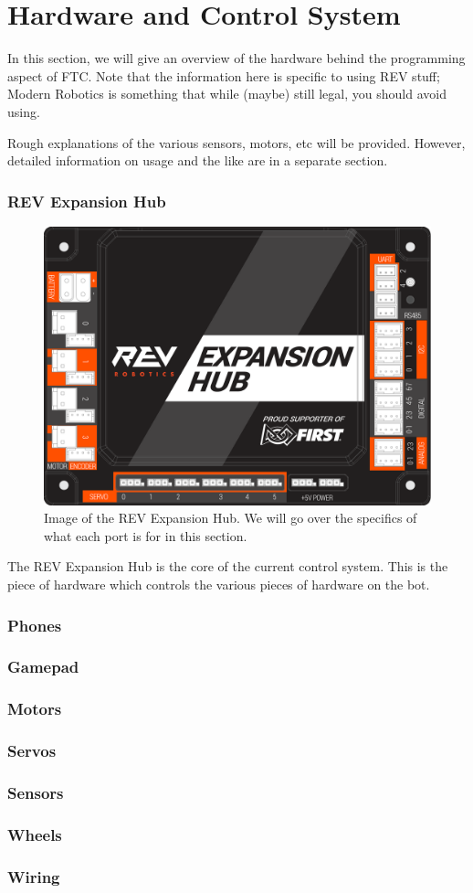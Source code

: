 \documentclass[../main.tex]{subfiles}
\begin{document}
\newpage
\part{Hardware and Control System}
In this section, we will give an overview of the hardware behind the programming aspect of FTC. Note that the information here is specific to using REV stuff; Modern Robotics is something that while (maybe) still legal, you should avoid using.

Rough explanations of the various sensors, motors, etc will be provided. However, detailed information on usage and the like are in a separate section.
\section{REV Expansion Hub}
\begin{figure}[H]
    \includegraphics{sections/controlSystem/images/expansion_hub_four.png}
    \caption{Image of the REV Expansion Hub. We will go over the specifics of what each port is for in this section.}
\end{figure}
The REV Expansion Hub is the core of the current control system. This is the piece of hardware which controls the various pieces of hardware on the bot. 
\section{Phones}
\section{Gamepad}
\section{Motors}
\section{Servos}
\section{Sensors}
\section{Wheels}
\section{Wiring}
\end{document}
